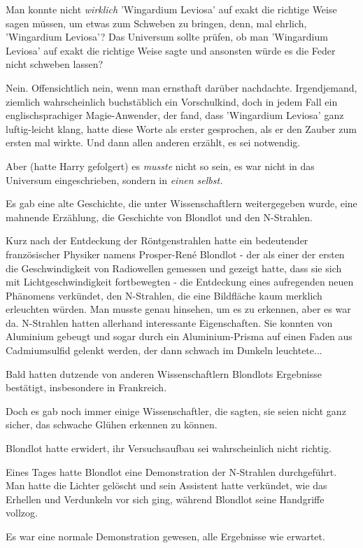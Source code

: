 {Man konnte nicht \emph{wirklich} 'Wingardium Leviosa' auf exakt die richtige Weise sagen müssen, um etwas zum Schweben zu bringen, denn, mal ehrlich, 'Wingardium Leviosa'? Das Universum sollte prüfen, ob man 'Wingardium Leviosa' auf exakt die richtige Weise sagte und ansonsten würde es die Feder nicht schweben lassen?

Nein. Offensichtlich nein, wenn man ernsthaft darüber nachdachte. Irgendjemand, ziemlich wahrscheinlich buchstäblich ein Vorschulkind, doch in jedem Fall ein englischsprachiger Magie-Anwender, der fand, dass 'Wingardium Leviosa' ganz luftig-leicht klang, hatte diese Worte als erster gesprochen, als er den Zauber zum ersten mal wirkte. Und dann allen anderen erzählt, es sei notwendig.

Aber (hatte Harry gefolgert) es \emph{musste} nicht so sein, es war nicht in das Universum eingeschrieben, sondern in \emph{einen selbst.}

Es gab eine alte Geschichte, die unter Wissenschaftlern weitergegeben wurde, eine mahnende Erzählung, die Geschichte von Blondlot und den N-Strahlen.

Kurz nach der Entdeckung der Röntgenstrahlen hatte ein bedeutender französischer Physiker namens Prosper-René Blondlot - der als einer der ersten die Geschwindigkeit von Radiowellen gemessen und gezeigt hatte, dass sie sich mit Lichtgeschwindigkeit fortbewegten - die Entdeckung eines aufregenden neuen Phänomens verkündet, den N-Strahlen, die eine Bildfläche kaum merklich erleuchten würden. Man musste genau hinsehen, um es zu erkennen, aber es war da. N-Strahlen hatten allerhand interessante Eigenschaften. Sie konnten von Aluminium gebeugt und sogar durch ein Aluminium-Prisma auf einen Faden aus Cadmiumsulfid gelenkt werden, der dann schwach im Dunkeln leuchtete...

Bald hatten dutzende von anderen Wissenschaftlern Blondlots Ergebnisse bestätigt, insbesondere in Frankreich.

Doch es gab noch immer einige Wissenschaftler, die sagten, sie seien nicht ganz sicher, das schwache Glühen erkennen zu können.

Blondlot hatte erwidert, ihr Versuchsaufbau sei wahrscheinlich nicht richtig.

Eines Tages hatte Blondlot eine Demonstration der N-Strahlen durchgeführt. Man hatte die Lichter gelöscht und sein Assistent hatte verkündet, wie das Erhellen und Verdunkeln vor sich ging, während Blondlot seine Handgriffe vollzog.

Es war eine normale Demonstration gewesen, alle Ergebnisse wie erwartet.

}
